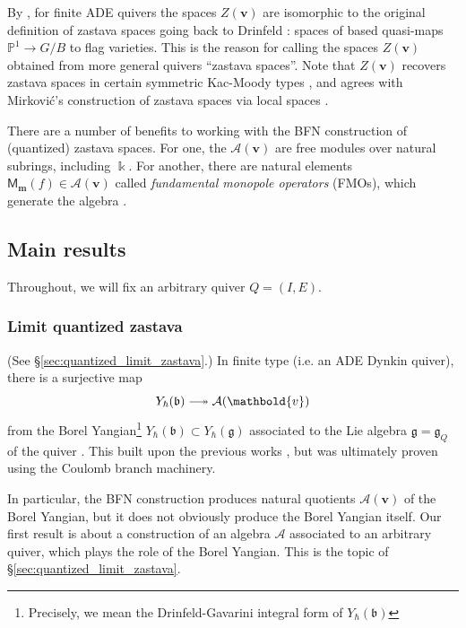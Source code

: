 \documentclass[11pt,reqno]{amsart}
\renewcommand{\mathbf}{\mathbold}
\numberwithin{equation}{section}
\theoremstyle{definition}
\newcommand{\cA}{\mathcal{A}}
\newcommand{\fg}{\mathfrak{g}}
\newcommand{\bm}{\mathbf{m}}
\newcommand{\bv}{\mathbf{v}}
\newcommand{\PP}{\mathbb{P}}
\newcommand{\twoheadlongrightarrow}{\relbar\joinrel\twoheadrightarrow}
\newcommand{\kk}{\Bbbk}
\renewcommand{\bv}{\mathbf{v}} %
\newcommand{\M}{\mathsf{M}}
\newcommand{\quiver}{Q}
\newcommand{\vertexset}{I}
\newcommand{\arrowset}{E}
\newcommand{\qzast}{\cA}
\begin{document}
By \cite[Corollary 3.4]{BFN2}, for finite ADE quivers the spaces $Z(\bv)$ are isomorphic to the original definition of zastava spaces going back to Drinfeld \cite{Finkelberg-Mirkovic}: spaces of based quasi-maps $\PP^1 \rightarrow G/B$ to flag varieties.   This is the reason for calling the spaces $Z(\bv)$ obtained from more general quivers ``zastava spaces''. Note that $Z(\bv)$ recovers zastava spaces in certain symmetric  Kac-Moody types \cite[Theorem 3.22]{BFN2}, and agrees with Mirkovi\'c's construction of zastava spaces via local spaces \cite{Dong}.

There are a number of benefits to working with the BFN construction of (quantized) zastava spaces.  For one, the $\qzast(\bv)$ are free modules over natural subrings, including  $\kk$.  For another, there are natural elements $\M_\bm(f) \in \qzast(\bv)$ called \emph{fundamental monopole operators} (FMOs), which generate the algebra \cite{Weekes,FT2}.

\subsection{Main results}

 Throughout, we will fix an arbitrary quiver $\quiver = (\vertexset, \arrowset)$.
\subsubsection{Limit quantized zastava} (See \S \ref{sec:quantized_limit_zastava}.)
In finite type (i.e. an ADE Dynkin quiver), there is a surjective map 
\begin{equation}
  \label{eq:59}
    Y_\hbar(\mathfrak{b}) \twoheadlongrightarrow \qzast(\bv)
\end{equation}
 from the Borel Yangian\footnote{Precisely, we mean the Drinfeld-Gavarini integral form of $Y_\hbar(\mathfrak{b})$}
$Y_\hbar(\mathfrak{b}) \subset Y_\hbar(\fg)$ associated to the Lie algebra $\fg = \fg_\quiver$ of the quiver \cite[Corollary B.28]{BFN2}. This built upon the previous works \cite{GKLO,FR,KWWY}, but was ultimately proven using the Coulomb branch machinery.

In particular, the BFN construction produces natural quotients $\qzast(\bv)$ of the Borel Yangian, but it does not obviously produce the Borel Yangian itself. Our first result is about a construction of an algebra $\cA$ associated to an arbitrary quiver, which plays the role of the Borel Yangian. This is the topic of \S \ref{sec:quantized_limit_zastava}. 
\end{document}

